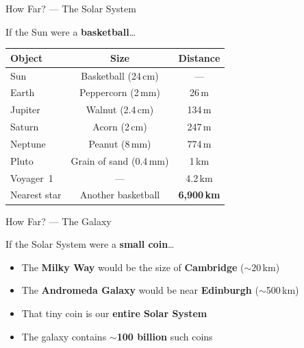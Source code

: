 \documentclass[aspectratio=169,14pt]{beamer}
\begin{document}
\begin{frame}{How Far? --- The Solar System}

\begin{center}
\Large If the Sun were a \textbf{basketball}\ldots
\end{center}

\bigskip

\begin{tabular}{lcc}
\toprule
\textbf{Object} & \textbf{Size} & \textbf{Distance} \\
\midrule
Sun          & Basketball (24\,cm)  & --- \\
Earth        & Peppercorn (2\,mm)   & 26\,m \\
Jupiter      & Walnut (2.4\,cm)     & 134\,m \\
Saturn       & Acorn (2\,cm)        & 247\,m \\
Neptune      & Peanut (8\,mm)       & 774\,m \\
Pluto        & Grain of sand (0.4\,mm) & 1\,km \\
Voyager~1    & ---                  & 4.2\,km \\
\midrule
Nearest star & Another basketball   & \textbf{6{,}900\,km} \\
\bottomrule
\end{tabular}

\end{frame}

\begin{frame}{How Far? --- The Galaxy}

\begin{center}
\Large If the Solar System were a \textbf{small coin}\ldots
\end{center}

\bigskip

\begin{itemize}
    \item The \textbf{Milky Way} would be the size of \textbf{Cambridge} ($\sim$20\,km)
    \item The \textbf{Andromeda Galaxy} would be near \textbf{Edinburgh} ($\sim$500\,km)
    \item That tiny coin is our \textbf{entire Solar System}
    \item The galaxy contains \textbf{$\sim$100 billion} such coins
\end{itemize}

\end{frame}
\end{document}
